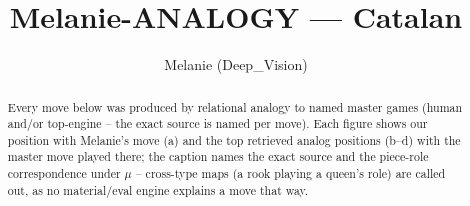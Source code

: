 \documentclass[11pt]{article}
\title{Melanie-ANALOGY — Catalan}
\author{Melanie (Deep\_Vision)}
\date{}
\begin{document}
\maketitle

\begin{abstract}Every move below was produced by relational analogy to named master games (human and/or top-engine -- the exact source is named per move). Each figure shows our position with Melanie's move (a) and the top retrieved analog positions (b--d) with the master move played there; the caption names the exact source and the piece-role correspondence under $\mu$ -- cross-type maps (a rook playing a queen's role) are called out, as no material/eval engine explains a move that way.\end{abstract}

\begin{figure}[p]\centering
\begin{subfigure}{0.46\textwidth}\centering
\resizebox{\linewidth}{!}{%
\newchessgame
\chessboard[
  setfen={rnbq1rk1/ppp1bppp/4pn2/8/2pP4/5NP1/PP2PPBP/RNBQ1RK1 w - - 0 7},
  showmover=false,
  pgfstyle=straightmove, color=movearrow, markmove={f3-e5}
]}
\caption{}
\end{subfigure}\hfill
\begin{subfigure}{0.46\textwidth}\centering
\resizebox{\linewidth}{!}{%
\newchessgame
\chessboard[
  setfen={rnbq1rk1/ppp1bppp/4pn2/8/2pP4/5NP1/PP2PPBP/RNBQ1RK1 w - - 0 7},
  showmover=false,
  pgfstyle=straightmove, color=movearrow, markmove={f3-e5}
]}
\caption{}
\end{subfigure}
\\[4pt]
\begin{subfigure}{0.46\textwidth}\centering
\resizebox{\linewidth}{!}{%
\newchessgame
\chessboard[
  setfen={rnbq1rk1/ppp1bppp/4pn2/8/2pP4/5NP1/PP2PPBP/RNBQ1RK1 w - - 0 7},
  showmover=false,
  pgfstyle=straightmove, color=movearrow, markmove={f3-e5}
]}
\caption{}
\end{subfigure}\hfill
\begin{subfigure}{0.46\textwidth}\centering
\resizebox{\linewidth}{!}{%
\newchessgame
\chessboard[
  setfen={rnbq1rk1/ppp1bppp/4pn2/8/2pP4/5NP1/PP2PPBP/RNBQ1RK1 w - - 0 7},
  showmover=false,
  pgfstyle=straightmove, color=movearrow, markmove={f3-e5}
]}
\caption{}
\end{subfigure}

\end{figure}
\end{document}
